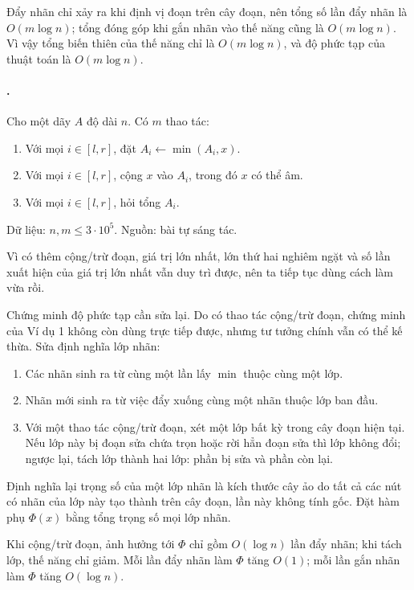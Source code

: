 \documentclass[11pt]{article}
\begin{document}
Đẩy nhãn chỉ xảy ra khi định vị đoạn trên cây đoạn, nên tổng số lần đẩy nhãn
là \(O(m\log n)\); tổng đóng góp khi gắn nhãn vào thế năng cũng là
\(O(m\log n)\). Vì vậy tổng biến thiên của thế năng chỉ là \(O(m\log n)\), và
độ phức tạp của thuật toán là \(O(m\log n)\).

\paragraph{.}
Cho một dãy \(A\) độ dài \(n\). Có \(m\) thao tác:
\begin{enumerate}
  \item Với mọi \(i\in[l,r]\), đặt \(A_i\leftarrow \min(A_i,x)\).
  \item Với mọi \(i\in[l,r]\), cộng \(x\) vào \(A_i\), trong đó \(x\) có thể
  âm.
  \item Với mọi \(i\in[l,r]\), hỏi tổng \(A_i\).
\end{enumerate}
Dữ liệu: \(n,m\le 3\cdot 10^5\). Nguồn: bài tự sáng tác.

Vì có thêm cộng/trừ đoạn, giá trị lớn nhất, lớn thứ hai nghiêm ngặt và số
lần xuất hiện của giá trị lớn nhất vẫn duy trì được, nên ta tiếp tục dùng
cách làm vừa rồi.

Chứng minh độ phức tạp cần sửa lại. Do có thao tác cộng/trừ đoạn, chứng minh
của Ví dụ 1 không còn dùng trực tiếp được, nhưng tư tưởng chính vẫn có thể kế
thừa. Sửa định nghĩa lớp nhãn:
\begin{enumerate}
  \item Các nhãn sinh ra từ cùng một lần lấy \(\min\) thuộc cùng một lớp.
  \item Nhãn mới sinh ra từ việc đẩy xuống cùng một nhãn thuộc lớp ban đầu.
  \item Với một thao tác cộng/trừ đoạn, xét một lớp bất kỳ trong cây đoạn
  hiện tại. Nếu lớp này bị đoạn sửa chứa trọn hoặc rời hẳn đoạn sửa thì lớp
  không đổi; ngược lại, tách lớp thành hai lớp: phần bị sửa và phần còn lại.
\end{enumerate}
Định nghĩa lại trọng số của một lớp nhãn là kích thước cây ảo do tất cả các
nút có nhãn của lớp này tạo thành trên cây đoạn, lần này không tính gốc. Đặt
hàm phụ \(\Phi(x)\) bằng tổng trọng số mọi lớp nhãn.

Khi cộng/trừ đoạn, ảnh hưởng tới \(\Phi\) chỉ gồm \(O(\log n)\) lần đẩy nhãn;
khi tách lớp, thế năng chỉ giảm. Mỗi lần đẩy nhãn làm \(\Phi\) tăng \(O(1)\);
mỗi lần gắn nhãn làm \(\Phi\) tăng \(O(\log n)\).
\end{document}
